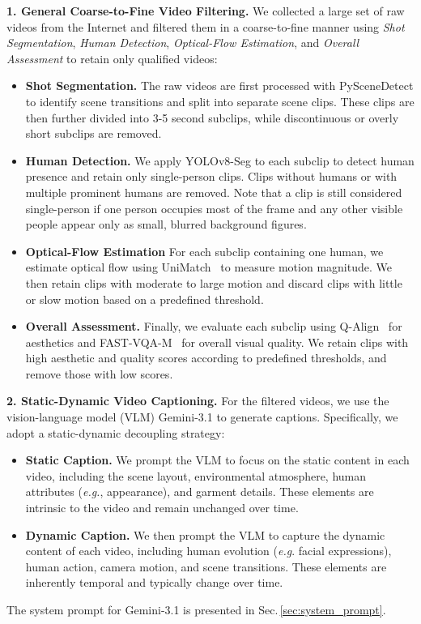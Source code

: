 \documentclass{llmxive}
\begin{document}
\noindent
\textbf{1. General Coarse-to-Fine Video Filtering.}
% 
We collected a large set of raw videos from the Internet and filtered them in a coarse-to-fine manner using \textit{Shot Segmentation}, \textit{Human Detection}, \textit{Optical-Flow Estimation}, and \textit{Overall Assessment} to retain only qualified videos:
\begin{itemize}
    \item \textbf{Shot Segmentation.} The raw videos are first processed with PySceneDetect to identify scene transitions and split into separate scene clips. These clips are then further divided into 3-5 second subclips, while discontinuous or overly short subclips are removed.
    \item \textbf{Human Detection.} We apply YOLOv8-Seg to each subclip to detect human presence and retain only single-person clips. Clips without humans or with multiple prominent humans are removed. Note that a clip is still considered single-person if one person occupies most of the frame and any other visible people appear only as small, blurred background figures.
    \item \textbf{Optical-Flow Estimation} For each subclip containing one human, we estimate optical flow using UniMatch~\cite{li2025unimatch} to measure motion magnitude. We then retain clips with moderate to large motion and discard clips with little or slow motion based on a predefined threshold.
    \item \textbf{Overall Assessment.} Finally, we evaluate each subclip using Q-Align~\cite{wu2023q} for aesthetics and FAST-VQA-M~\cite{wu2022fast} for overall visual quality. We retain clips with high aesthetic and quality scores according to predefined thresholds, and remove those with low scores.
\end{itemize}



\noindent
\textbf{2. Static-Dynamic Video Captioning.}
% 
For the filtered videos, we use the vision-language model (VLM) Gemini-3.1 to generate captions. Specifically, we adopt a static-dynamic decoupling strategy:
\begin{itemize}
    \item \textbf{Static Caption.} We prompt the VLM to focus on the static content in each video, including the scene layout, environmental atmosphere, human attributes (\emph{e.g.}, appearance), and garment details. These elements are intrinsic to the video and remain unchanged over time.
    \item \textbf{Dynamic Caption.} We then prompt the VLM to capture the dynamic content of each video, including human evolution (\emph{e.g}. facial expressions), human action, camera motion, and scene transitions. These elements are inherently temporal and typically change over time.
\end{itemize}
% 
The system prompt for Gemini-3.1 is presented in Sec.\,\ref{sec:system_prompt}.
\end{document}
